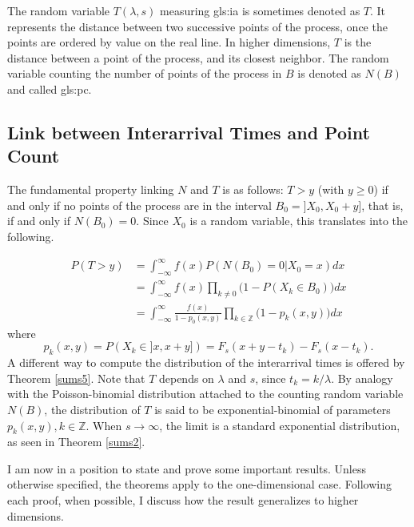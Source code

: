 \documentclass[10pt]{article}
\begin{document}
The random variable  $T(\lambda,s)$ measuring \gls{gls:ia} is sometimes denoted as $T$. It represents the distance between two successive points of the process, once the points are ordered by value on the real line. In higher dimensions, $T$ is the distance between a point of the process, and its closest neighbor. The random variable counting the number of points of the process in $B$ is denoted as $N(B)$ and called \gls{gls:pc}. 
\subsection{Link between Interarrival Times and Point Count}\label{link20}

The fundamental property linking $N$ and $T$ is as follows: $T>y$ (with $y\geq 0$) if and only if no points of the process are in the interval $B_0=]X_0,X_0+y]$, that is, if and only if $N(B_0)=0$. Since $X_0$ is a random variable, this translates into the following.

\begin{align}
P(T>y) & =\int_{-\infty}^\infty f(x)P(N(B_0)=0 | X_0 = x) dx  \nonumber \\
 & =  \int_{-\infty}^\infty f(x)\prod_{k\neq 0}\Big(1-P(X_k\in B_0) \Big)dx \nonumber \\
 & =  \int_{-\infty}^\infty \frac{f(x)}{1-p_0(x,y)}\prod_{k\in\mathbb{Z}}\Big(1-p_k(x,y) \Big)dx \label{eq:1}
\end{align}
where 
\begin{equation}
p_k(x,y) =P(X_k \in ]x, x+y])=F_s(x+y-t_k)-F_s(x-t_k). \label{eq:2}
\end{equation}
A different way to compute the distribution of the interarrival times is offered by Theorem \ref{sums5}. Note that $T$ depends on $\lambda$ and $s$, since $t_k=k/\lambda$. By analogy with the Poisson-binomial distribution attached to the counting random variable $N(B)$, the distribution of $T$ is said to be \textcolor{index}{exponential-binomial}  of parameters $p_k(x,y), k\in \mathbb{Z}$. When $s\rightarrow\infty$, the limit is a standard exponential distribution, as seen in Theorem \ref{sums2}. 


\noindent I am now in a position to state and prove some important results. Unless otherwise specified, the theorems apply to the one-dimensional case. Following each proof, when possible, I discuss how the result generalizes to higher dimensions.
\end{document}
